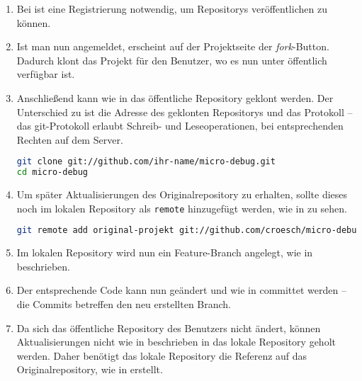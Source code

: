 \begin{enumerate}
\item Bei  ist eine Registrierung notwendig, um Repositorys veröffentlichen zu können.

\item Ist man nun angemeldet, erscheint auf der Projektseite \cite{Roesch2012} der \emph{fork}-Button. Dadurch klont  das Projekt für den Benutzer, wo es nun unter  öffentlich verfügbar ist.

\item Anschließend kann wie in  das öffentliche Repository geklont werden. Der Unterschied zu  ist die Adresse des geklonten Repositorys und das Protokoll -- das \gls{git}-Protokoll erlaubt Schreib- und Leseoperationen, bei entsprechenden Rechten auf dem Server.

\begin{lstlisting}[language=sh,caption={\md mit git vom Benutzerrepository klonen},label=\lstlbl{git-benutzer-klonen}]
git clone git://github.com/ihr-name/micro-debug.git
cd micro-debug
\end{lstlisting}

\item Um später Aktualisierungen des Originalrepository zu erhalten, sollte dieses noch im lokalen Repository als \texttt{remote} hinzugefügt werden, wie in  zu sehen.

\begin{lstlisting}[language=sh,caption={Originalrepository des \md dem lokalen Repository als \texttt{remote} hinzufügen},label=\lstlbl{git-add-original-remote}]
git remote add original-projekt git://github.com/croesch/micro-debug.git
\end{lstlisting}

\item Im lokalen Repository wird nun ein Feature-Branch angelegt, wie in  beschrieben.

\item Der entsprechende Code kann nun geändert und wie in  committet werden -- die Commits betreffen den neu erstellten Branch.

\item Da sich das öffentliche Repository des Benutzers nicht ändert, können Aktualisierungen nicht wie in  beschrieben in das lokale Repository geholt werden. Daher benötigt das lokale Repository die Referenz auf das Originalrepository, wie in  erstellt.


\end{enumerate}
